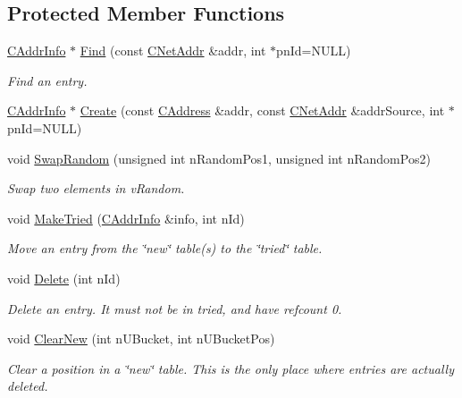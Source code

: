 \subsection*{Protected Member Functions}
\begin{DoxyCompactItemize}
\item 
\mbox{\hyperlink{class_c_addr_info}{C\+Addr\+Info}} $\ast$ \mbox{\hyperlink{class_c_addr_man_ac961ead1a1afde144fc486b6d7c7369d}{Find}} (const \mbox{\hyperlink{class_c_net_addr}{C\+Net\+Addr}} \&addr, int $\ast$pn\+Id=N\+U\+LL)
\begin{DoxyCompactList}\small\item\em Find an entry. \end{DoxyCompactList}\item 
\mbox{\hyperlink{class_c_addr_info}{C\+Addr\+Info}} $\ast$ \mbox{\hyperlink{class_c_addr_man_aac93f51c0580e38a950a0f63b053bedb}{Create}} (const \mbox{\hyperlink{class_c_address}{C\+Address}} \&addr, const \mbox{\hyperlink{class_c_net_addr}{C\+Net\+Addr}} \&addr\+Source, int $\ast$pn\+Id=N\+U\+LL)
\item 
void \mbox{\hyperlink{class_c_addr_man_a3074bc8e3dcfb5348054613f575dc38e}{Swap\+Random}} (unsigned int n\+Random\+Pos1, unsigned int n\+Random\+Pos2)
\begin{DoxyCompactList}\small\item\em Swap two elements in v\+Random. \end{DoxyCompactList}\item 
void \mbox{\hyperlink{class_c_addr_man_a98e8383efb48b7c2932795438f35a10a}{Make\+Tried}} (\mbox{\hyperlink{class_c_addr_info}{C\+Addr\+Info}} \&info, int n\+Id)
\begin{DoxyCompactList}\small\item\em Move an entry from the \char`\"{}new\char`\"{} table(s) to the \char`\"{}tried\char`\"{} table. \end{DoxyCompactList}\item 
void \mbox{\hyperlink{class_c_addr_man_af488eac123030538770dbc4e3b16eb74}{Delete}} (int n\+Id)
\begin{DoxyCompactList}\small\item\em Delete an entry. It must not be in tried, and have refcount 0. \end{DoxyCompactList}\item 
void \mbox{\hyperlink{class_c_addr_man_ab283de3e750f006c85573976bd40da81}{Clear\+New}} (int n\+U\+Bucket, int n\+U\+Bucket\+Pos)
\begin{DoxyCompactList}\small\item\em Clear a position in a \char`\"{}new\char`\"{} table. This is the only place where entries are actually deleted. \end{DoxyCompactList}\item 

\end{DoxyCompactItemize}

